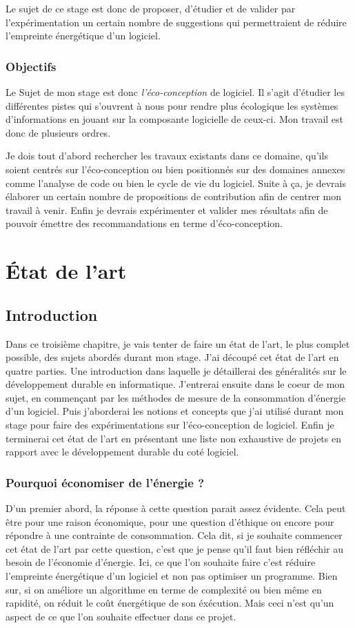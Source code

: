 \documentclass[a4paper, 11pt]{report}
\begin{document}
Le sujet de ce stage est donc de proposer, d'étudier et de valider par l'expérimentation un certain nombre de suggestions qui permettraient de réduire l'empreinte énergétique d'un logiciel.

		\subsection{Objectifs}
Le Sujet de mon stage est donc \textit{l'éco-conception} de logiciel. Il s'agit d'étudier les différentes pistes qui s'ouvrent à nous pour rendre plus écologique les systèmes d'informations en jouant sur la composante logicielle de ceux-ci. Mon travail est donc de plusieurs ordres.

Je dois tout d'abord rechercher les travaux existants dans ce domaine, qu'ils soient centrés sur l'éco-conception ou bien positionnés sur des domaines annexes comme l'analyse de code ou bien le cycle de vie du logiciel. Suite à ça, je devrais élaborer un certain nombre de propositions de contribution afin de centrer mon travail à venir. Enfin je devrais expérimenter et valider mes résultats afin de pouvoir émettre des recommandations en terme d'éco-conception.

\chapter{État de l'art}
	\section{Introduction}
Dans ce troisième chapitre, je vais tenter de faire un état de l'art, le plus complet possible, des sujets abordés durant mon stage. J'ai découpé cet état de l'art en quatre parties. Une introduction dans laquelle je détaillerai des généralités sur le développement durable en informatique. J'entrerai ensuite dans le coeur de mon sujet, en commençant par les méthodes de mesure de la consommation d'énergie d'un logiciel. Puis j'aborderai les notions et concepts que j'ai utilisé durant mon stage pour faire des expérimentations sur l'éco-conception de logiciel. Enfin je terminerai cet état de l'art en présentant une liste non exhaustive de projets en rapport avec le développement durable du coté logiciel.

		\subsection{Pourquoi économiser de l'énergie ?}
D'un premier abord, la réponse à cette question parait assez évidente. Cela peut être pour une raison économique, pour une question d'éthique ou encore pour répondre à une contrainte de consommation. Cela dit, si je souhaite commencer cet état de l'art par cette question, c'est que je pense qu'il faut bien réfléchir au besoin de l'économie d'énergie. Ici, ce que l'on souhaite faire c'est réduire l'empreinte énergétique d'un logiciel et non pas optimiser un programme. Bien sur, si on améliore un algorithme en terme de complexité ou bien même en rapidité, on réduit le coût énergétique de son éxécution. Mais ceci n'est qu'un aspect de ce que l'on souhaite effectuer dans ce projet. 
\end{document}
